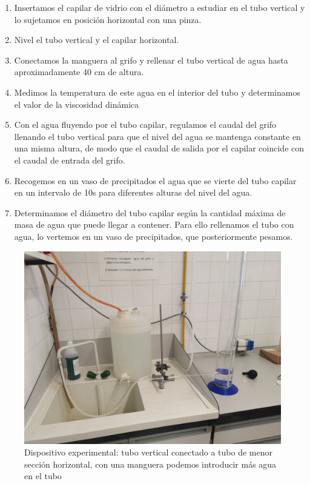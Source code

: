 \documentclass[a4paper,12pt,spanish]{article}
\begin{document}
	\begin{enumerate}
		\item Insertamos el capilar de vidrio con el diámetro a estudiar en el tubo vertical y lo sujetamos en posición horizontal con una pinza.
		\item Nivel el tubo vertical y el capilar horizontal.
		\item Conectamos la manguera al grifo y rellenar el tubo vertical de agua hasta aproximadamente 40 cm de altura.
		\item Medimos la temperatura de este agua en el interior del tubo y determinamos el valor de la viscosidad dinámica
		\item  Con el agua fluyendo por el tubo capilar, regulamos el caudal del grifo llenando el tubo vertical para que el nivel del agua se mantenga constante en una misma altura, de modo que el caudal de salida por el capilar coincide con el caudal de entrada del grifo.
		\item Recogemos en un vaso de precipitados el agua que se vierte del tubo capilar en un intervalo de 10s para diferentes alturas del nivel del agua.
		\item Determinamos el diámetro del tubo capilar según la cantidad máxima de masa de agua que puede llegar a contener. Para ello rellenamos el tubo con agua, lo vertemos en un vaso de precipitados, que posteriormente pesamos.
	\end{enumerate}
	
	
\begin{figure}[H]
	\centering
	\includegraphics[width=0.7\linewidth]{../IMG_20240307_124615}
	\caption{Dispositivo experimental: tubo vertical conectado a tubo de menor sección horizontal, con una manguera podemos introducir más agua en el tubo}
	\label{fig:img20240307124615}
\end{figure}
	
\end{document}
